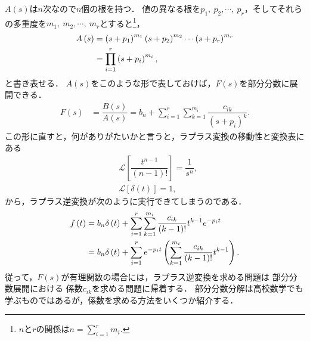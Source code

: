 $A(s)$は$n$次なので$n$個の根を持つ．
値の異なる根を$p_1,~p_2,\cdots,~p_r$，そしてそれらの多重度を$m_1,~m_2,\cdots,~m_r$とすると\footnote{$n$と$r$の関係は$n=\displaystyle\sum_{i=1}^{r}m_{i}$.}，
%
\begin{align}
 A\left(s\right) & =\left(s+p_{1}\right)^{m_{1}}\left(s+p_{2}\right)^{m_{2}}\cdots\left(s+p_{r}\right)^{m_{r}}\notag\\
 & =\prod_{i=1}^{r}\left(s+p_{i}\right)^{m_{i}},
\end{align}
と書き表せる．
$A(s)$をこのような形で表しておけば，$F(s)$を部分分数に展開できる．
%
\begin{align}
 F\left(s\right) & =\dfrac{B\left(s\right)}{A\left(s\right)}=b_{n}+\sum_{i=1}^{r}\sum_{k=1}^{m_{i}}\dfrac{c_{ik}}{\left(s+p_{i}\right)^{k}}. \label{partial_fraction_expansion}
\end{align}
%
この形に直すと，何がありがたいかと言うと，ラプラス変換の移動性と変換表にある
\begin{align}
 &\mathcal{L}\left[\dfrac{t^{n-1}}{(n-1)!}\right] = \dfrac{1} {s^n}, \\
 &\mathcal{L}\left[\delta(t)\right] = 1,
\end{align}
から，ラプラス逆変換が次のように実行できてしまうのである．
%
\begin{align}
f\left(t\right) & =b_{n}\delta\left(t\right)+\sum_{i=1}^{r}\sum_{k=1}^{m_{i}}\dfrac{c_{ik}}{\left(k-1\right)!}t^{k-1}e^{-p_{i}t}\notag\\
 & =b_{n}\delta\left(t\right)+\sum_{i=1}^{r}e^{-p_{i}t}\left(\sum_{k=1}^{m_{i}}\dfrac{c_{ik}}{\left(k-1\right)!}t^{k-1}\right). 
\end{align}
%
従って，$F(s)$が有理関数の場合には，ラプラス逆変換を求める問題は
部分分数展開における
係数$c_{ik}$を求める問題に帰着する．
部分分数分解は高校数学でも学ぶものではあるが，係数を求める方法をいくつか紹介する．
%
